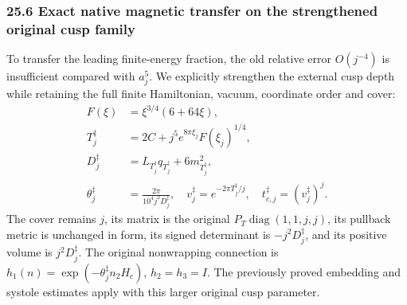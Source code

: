 \documentclass[
  11pt,
]{article}
\begin{document}
\subsubsection{25.6 Exact native magnetic transfer on the strengthened
original cusp
family}\label{exact-native-magnetic-transfer-on-the-strengthened-original-cusp-family}

To transfer the leading finite-energy fraction, the old relative error
\(O(j^{-4})\) is insufficient compared with \(a_j^5\). We explicitly
strengthen the external cusp depth while retaining the full finite
Hamiltonian, vacuum, coordinate order and cover: \[
 \begin{split}
 F(\xi)&=\xi^{3/4}(6+64\xi),\\
 T_j^{\ddagger}
    &=2C+j^5 e^{8\pi\xi_j}F(\xi_j)^{1/4},\\
 D_j^{\ddagger}
    &=L_{T_j^{\ddagger}}q_{T_j^{\ddagger}}
                             +6m_{T_j^{\ddagger}}^2,\\
 \theta_j^{\ddagger}&=\frac{2\pi}{10^4j^2D_j^{\ddagger}},\quad
 v_j^{\ddagger}=e^{-2\pi T_j^{\ddagger}/j},\quad
 t_{c,j}^{\ddagger}=(v_j^{\ddagger})^j .
 \end{split}\tag{445}
\] The cover remains \(j\), its matrix is the original
\(P_T\operatorname{diag}(1,1,j,j)\), its pullback metric is unchanged in
form, its signed determinant is \(-j^2D_j^\ddagger\), and its positive
volume is \(j^2D_j^\ddagger\). The original nonwrapping connection is
\(h_1(n)=\exp(-\theta_j^\ddagger n_2H_c)\), \(h_2=h_3=I\). The
previously proved embedding and systole estimates apply with this larger
original cusp parameter.
\end{document}
